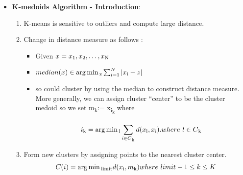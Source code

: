 \documentclass[a4paper,10pt]{article}
\DeclareMathOperator*{\argmin}{arg\,min}
\newcommand{\algrule}[1][.2pt]{\par\vskip.5\baselineskip\hrule height #1\par\vskip.5\baselineskip}
\begin{document}
\begin{itemize}
\item \textbf{K-medoids Algorithm - Introduction}:
\begin{enumerate}
        \item K-means is sensitive to outliers and compute large distance.
        \item Change in distance measure as follows :
        \begin{itemize}
        	\item Given ${x={x\textsubscript{1}, x\textsubscript{2},\dots, x\textsubscript{N}}}$
        	\item $ median(x) \in \argmin\textsubscript{z}\sum_{i=1}^{N}|x\textsubscript{i}-z|$
        	\item so could cluster by using the median to construct distance measure.
        	More generally, we can assign cluster “center” to be the cluster medoid so we set m\textsubscript{k}:= x\textsubscript{i\textsubscript{k}} where

        	\begin{equation*}
                 i\textsubscript{k} = \argmin\textsubscript{l} \sum_{i \in C\textsubscript{k}}^{ } d(x\textsubscript{l}, x\textsubscript{i}).
                 where \
                 l \in C\textsubscript{k}
        	\end{equation*}
        	 \end{itemize}
        \item Form new clusters by assigning points to the nearest cluster center.
        \begin{equation*}
           C(i) = \argmin\textsubscript{limit} d(x\textsubscript{i} , m\textsubscript{k})
           where \
            limit - 1\le k \le K
        \end{equation*}
\end{enumerate}
	\pagebreak
	\begin{itemize}
	

\end{itemize}
\end{itemize}
\end{document}
